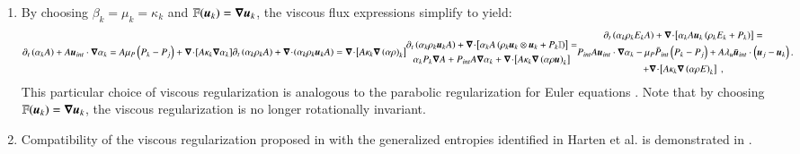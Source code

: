 \documentclass[preprint,10pt]{elsarticle}
\begin{document}
\begin{enumerate}
\item{By choosing $\beta_k = \mu_k = \kappa_k$ and $\mathbb{F}(\boldsymbol u_k) = \boldsymbol\nabla \boldsymbol u_k$, the viscous flux expressions simplify to yield: 
\begin{subequations}\label{eq:sev_equ-parab}
\begin{align}\label{eq:sev_equ-parab-vf}
\partial_t \left( \alpha_k  A\right) + A \mbold u_{int} \cdot \grad \alpha_k = A \mu_P \left( P_k - P_j \right) + \div \left[ A \kappa_k \grad \alpha_k \right]
\end{align}
\begin{align}\label{eq:sev_equ-parab-cont}
\partial_t \left( \alpha_k \rho_k A \right) + \div \left( \alpha_k \rho_k \mbold u_k A \right) = \div \left[ A \kappa_k \grad \left( \alpha \rho \right)_k \right]
\end{align}
\begin{multline}\label{eq:sev_equ-parab-mom}
\partial_t \left( \alpha_k \rho_k \mbold u_k A \right) + \div \left[ \alpha_k A \left( \rho_k \mbold u_k \otimes \mbold u_k + P_k \mathbb{I} \right) \right] = \\
\alpha_k P_k \grad A + P_{int} A \grad \alpha_k + \div \left[ A \kappa_k \grad \left( \alpha \rho \mbold u  \right)_k \right] 
\end{multline}
\begin{multline}\label{eq:sev_equ-parab-ener}
\partial_t \left( \alpha_k \rho_k E_k A \right) + \div \left[ \alpha_k A \mbold u_k \left( \rho_k E_k + P_k \right) \right] = \\
P_{int} A \mbold u_{int} \cdot \grad \alpha_k -
\mu_P \bar{P}_{int} \left( P_k-P_j \right) + 
A \lambda_u \bar{\mbold u}_{int} \cdot \left( \mbold u_j - \mbold u_k \right)  \\
+ \div \left[A \kappa_k \grad \left( \alpha \rho E \right)_k \right] \ ,
\end{multline} \,.
\end{subequations}
This particular choice of viscous regularization is analogous to the parabolic regularization for Euler equations \cite{Parabolic}. Note that by choosing $\mathbb{F}(\boldsymbol u_k) = \boldsymbol\nabla \boldsymbol u_k$, the viscous regularization is no longer rotationally invariant.
}
    
\item{Compatibility of the viscous regularization proposed in  with the generalized entropies identified in Harten et al. \cite{Harten} is demonstrated in . } 

\end{enumerate}
\end{document}
